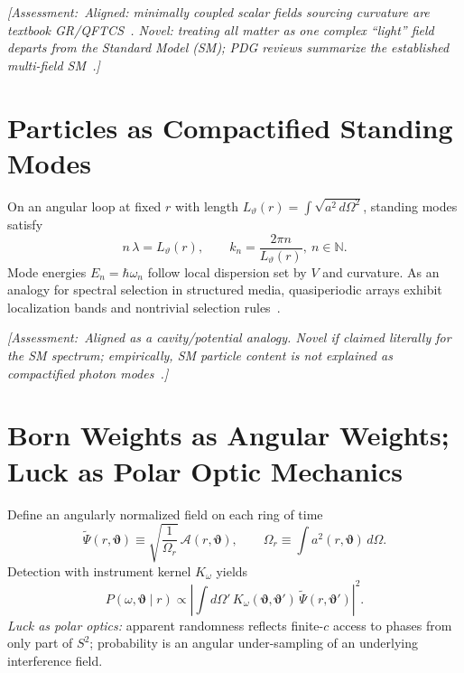 \documentclass[reprint,amsmath,amssymb,aps,pra]{revtex4-2} %
\newcommand{\A}{\mathcal{A}}                   %
\newcommand{\polang}{\vartheta}                %
\newcommand{\polangb}{\boldsymbol{\vartheta}}  %
\newcommand{\Assessment}[1]{\par\smallskip\noindent\textit{\color{blue}[Assessment:\ #1]}\par\smallskip}
\begin{document}
\Assessment{Aligned: minimally coupled scalar fields sourcing curvature are textbook GR/QFTCS~\cite{BirrellDavies,ParkerToms}. Novel: treating \emph{all} matter as one complex ``light'' field departs from the Standard Model (SM); PDG reviews summarize the established multi-field SM~\cite{PDG2024}.}

\section{Particles as Compactified Standing Modes}
On an angular loop at fixed $r$ with length $L_\polang(r)=\int\sqrt{a^2\,d\Omega^2}$, standing modes satisfy
\begin{equation}
  n\,\lambda = L_\polang(r),\qquad k_n=\frac{2\pi n}{L_\polang(r)},\ n\in\mathbb{N}.
  \label{eq:quantization}
\end{equation}
Mode energies $E_n=\hbar\omega_n$ follow local dispersion set by $V$ and curvature. As an analogy for spectral selection in structured media, quasiperiodic arrays exhibit localization bands and nontrivial selection rules~\cite{WahlstromChao1988}.

\Assessment{Aligned as a cavity/potential analogy. Novel if claimed literally for the SM spectrum; empirically, SM particle content \emph{is not} explained as compactified photon modes~\cite{PDG2024}.}

\section{Born Weights as Angular Weights; Luck as Polar Optic Mechanics}
Define an angularly normalized field on each ring of time
\begin{equation}
  \tilde{\Psi}(r,\polangb) \equiv \sqrt{\frac{1}{\Omega_r}}\,\A(r,\polangb),\qquad
  \Omega_r\equiv\int a^2(r,\polangb)\,d\Omega.
  \label{eq:polar-psi}
\end{equation}
Detection with instrument kernel $K_\omega$ yields
\begin{equation}
  P(\omega,\polangb\mid r)\propto\left|\int d\Omega'\,K_\omega(\polangb,\polangb')\,\tilde{\Psi}(r,\polangb')\right|^2.
\end{equation}
\emph{Luck as polar optics:} apparent randomness reflects finite-$c$ access to phases from only part of $S^2$; probability is an angular under-sampling of an underlying interference field.
\end{document}
